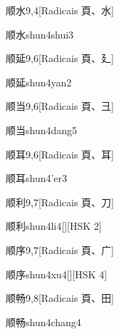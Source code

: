 \begin{entry}{顺水}{9,4}[Radicais ⾴、⽔]
  \begin{phonetics}{顺水}{shun4shui3}
  \end{phonetics}
\end{entry}

\begin{entry}{顺延}{9,6}[Radicais ⾴、⼵]
  \begin{phonetics}{顺延}{shun4yan2}
  \end{phonetics}
\end{entry}

\begin{entry}{顺当}{9,6}[Radicais ⾴、⼹]
  \begin{phonetics}{顺当}{shun4dang5}
  \end{phonetics}
\end{entry}

\begin{entry}{顺耳}{9,6}[Radicais ⾴、⽿]
  \begin{phonetics}{顺耳}{shun4'er3}
  \end{phonetics}
\end{entry}

\begin{entry}{顺利}{9,7}[Radicais ⾴、⼑]
  \begin{phonetics}{顺利}{shun4li4}[][HSK 2]
  \end{phonetics}
\end{entry}

\begin{entry}{顺序}{9,7}[Radicais ⾴、⼴]
  \begin{phonetics}{顺序}{shun4xu4}[][HSK 4]
  \end{phonetics}
\end{entry}

\begin{entry}{顺畅}{9,8}[Radicais ⾴、⽥]
  \begin{phonetics}{顺畅}{shun4chang4}
  \end{phonetics}
\end{entry}

